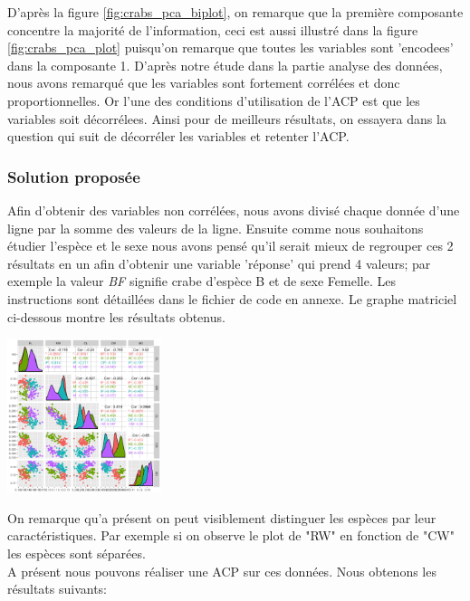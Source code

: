 \documentclass[10pt]{article}
\begin{document}
	D'après la figure \ref{fig:crabs_pca_biplot}, on remarque que la première composante concentre la majorité de l'information, ceci est aussi illustré dans la figure \ref{fig:crabs_pca_plot} puisqu'on remarque que toutes les variables sont 'encodees' dans la composante 1. D'après notre étude dans la partie analyse des données, nous avons remarqué que les variables sont fortement corrélées et donc proportionnelles. Or l'une des conditions d'utilisation de l'ACP est que les variables soit décorrélees. Ainsi pour de meilleurs résultats, on essayera dans la question qui suit de décorréler les variables et retenter l'ACP.
	
	\subsubsection{Solution proposée}
	Afin d'obtenir des variables non corrélées, nous avons divisé chaque donnée d'une ligne par la somme des valeurs de la ligne. Ensuite comme nous souhaitons étudier l'espèce et le sexe nous avons pensé qu'il serait mieux de regrouper ces 2 résultats en un afin d'obtenir une variable 'réponse' qui prend 4 valeurs; par exemple la valeur \textit{BF} signifie crabe d'espèce B et de sexe Femelle. Les instructions sont détaillées dans le fichier de code en annexe. Le graphe matriciel  ci-dessous montre les résultats obtenus.
	
	\begin{center}
		\includegraphics[width=45mm]{Figures/Crabs/matricial_plot_decorr_classes.png}	
		\label{fig:crabs_matricial_plot_decorr}
	\end{center}

	On remarque qu'a présent on peut visiblement distinguer les espèces par leur caractéristiques. Par exemple si on observe le plot de  "RW" en fonction de "CW" les espèces sont séparées.\\
	
	A présent nous pouvons réaliser une ACP sur ces données. Nous obtenons les résultats suivants:
	
\end{document}
